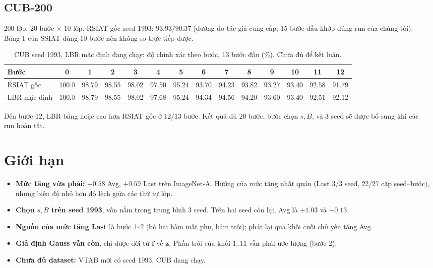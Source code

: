 \documentclass[11pt]{article}
\newcommand{\vf}{\mathbf{f}}
\newcommand{\vz}{\mathbf{z}}
\begin{document}
\subsection{CUB-200}
200 lớp, 20 bước $\times$ 10 lớp. RSIAT gốc seed 1993: $93.93/90.37$ (đường do tác giả cung cấp; 15 bước đầu khớp đúng
run của chúng tôi). Bảng 1 của SSIAT dùng 10 bước nên không so trực tiếp được.

\begin{table}[H]
\centering\footnotesize
\setlength{\tabcolsep}{3.5pt}
\caption{CUB seed 1993, LBR mặc định đang chạy: độ chính xác theo bước, 13 bước đầu (\%). Chưa đủ để kết luận.}
\label{tab:cub_partial}
\begin{tabular}{lccccccccccccc}
\toprule
Bước & 0 & 1 & 2 & 3 & 4 & 5 & 6 & 7 & 8 & 9 & 10 & 11 & 12\\
\midrule
RSIAT gốc & 100.0 & 98.79 & 98.55 & 98.02 & 97.50 & 95.24 & 93.70 & 94.23 & 93.82 & 93.27 & 93.40 & 92.58 & 91.79\\
LBR mặc định & 100.0 & 98.79 & 98.55 & 98.02 & 97.68 & 95.24 & 94.34 & 94.56 & 94.20 & 93.60 & 93.40 & 92.51 & 92.12\\
\bottomrule
\end{tabular}
\end{table}
Đến bước 12, LBR bằng hoặc cao hơn RSIAT gốc ở 12/13 bước. Kết quả đủ 20 bước, bước chọn $s,B$, và 3 seed sẽ được bổ
sung khi các run hoàn tất.

\section{Giới hạn}
\begin{itemize}
\item \textbf{Mức tăng vừa phải:} $+0.58$ Avg, $+0.59$ Last trên ImageNet-A. Hướng của mức tăng nhất quán (Last 3/3
      seed, 22/27 cặp seed--bước), nhưng biên độ nhỏ hơn độ lệch giữa các thứ tự lớp.
\item \textbf{Chọn $s,B$ trên seed 1993}, vốn nằm trong trung bình 3 seed. Trên hai seed còn lại, Avg là $+1.03$ và
      $-0.13$.
\item \textbf{Nguồn của mức tăng Last} là bước 1--2 (bỏ hai hàm mất phụ, bám trôi); phát lại qua khối cuối chủ yếu tăng
      Avg.
\item \textbf{Giả định Gauss vẫn còn}, chỉ được dời từ $\vf$ về $\vz$. Phần trôi của khối 1..11 vẫn phải ước lượng
      (bước 2).
\item \textbf{Chưa đủ dataset:} VTAB mới có seed 1993, CUB đang chạy.
\end{itemize}
\end{document}

